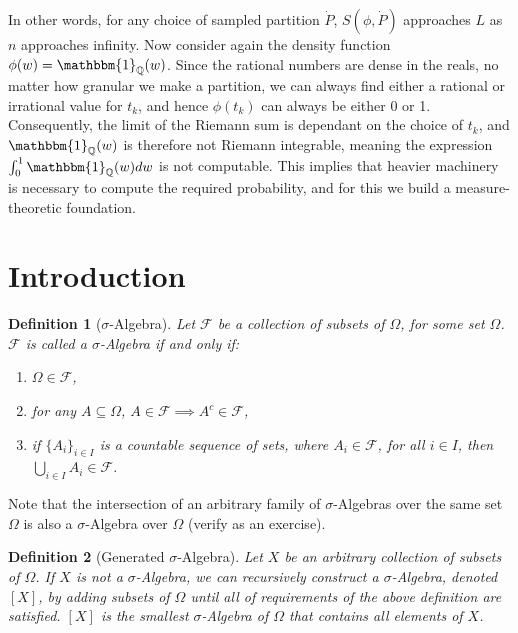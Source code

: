 \documentclass[10pt, oneside]{article}
\newcommand{\Q}{\mathbb{Q}}
\newtheorem{defn}{Definition}
\begin{document}
In other words, for any choice of sampled partition $\dot{P}$, $S(\phi,\dot{P})$ approaches $L$ as $n$ approaches infinity.
Now consider again the density function $\phi(w)=\mathbbm{1}_{\Q}(w)$.
Since the rational numbers are dense in the reals, no matter how granular we make a partition, we can always find either a rational or irrational value for $t_k$, and hence $\phi(t_k)$ can always be either 0 or 1. 
Consequently, the limit of the Riemann sum is dependant on the choice of $t_k$, and $\mathbbm{1}_{\Q}(w)$ is therefore not Riemann integrable, meaning the expression $\int_{0}^{1}\mathbbm{1}_{\Q}(w)dw$ is not computable.
This implies that heavier machinery is necessary to compute the required probability, and for this we build a measure-theoretic foundation.

\section{Introduction}
\begin{defn}[$\sigma$-Algebra]
    \label{defn:SA}
    Let $\mathcal{F}$ be a collection of subsets of $\Omega$, for some set $\Omega$.
    $\mathcal{F}$ is called a $\sigma$-Algebra if and only if:
    \begin{enumerate}
        \item $\Omega \in \mathcal{F}$, 
        \item for any $A \subseteq \Omega$, $A \in \mathcal{F} \implies 
            A^{c} \in \mathcal{F}$, 
        \item if $\{A_{i}\}_{i \in I}$ is a countable sequence of sets, where $A_i 
            \in \mathcal{F}$, for all $i \in I$, then $\bigcup_{i \in I}A_{i} \in 
            \mathcal{F}$.  
    \end{enumerate} 
\end{defn} 

Note that the intersection of an arbitrary family of $\sigma$-Algebras over the 
same set $\Omega$ is also a $\sigma$-Algebra over $\Omega$ (verify as an exercise). 

\begin{defn}[Generated $\sigma$-Algebra]
    \label{defn:gen-SA}
    Let $X$ be an arbitrary collection of subsets of $\Omega$. If $X$ is not a 
    $\sigma$-Algebra, we can recursively construct a $\sigma$-Algebra, denoted $[X]$,
    by adding subsets of $\Omega$ until all of requirements of the above definition
    are satisfied. $[X]$ is the smallest $\sigma$-Algebra of $\Omega$ that contains
    all elements of $X$. 
\end{defn}
\end{document}
